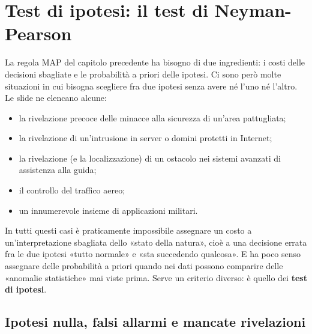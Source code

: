 \chapter{Test di ipotesi: il test di Neyman-Pearson}

La regola MAP del capitolo precedente ha bisogno di due ingredienti: i costi delle decisioni sbagliate e le probabilità
a priori delle ipotesi. Ci sono però molte situazioni in cui bisogna scegliere fra due ipotesi senza avere né l'uno né
l'altro. Le slide ne elencano alcune:
\begin{itemize}
  \item la rivelazione precoce delle minacce alla sicurezza di un'area pattugliata;
  \item la rivelazione di un'intrusione in server o domini protetti in Internet;
  \item la rivelazione (e la localizzazione) di un ostacolo nei sistemi avanzati di assistenza alla guida;
  \item il controllo del traffico aereo;
  \item un innumerevole insieme di applicazioni militari.
\end{itemize}
In tutti questi casi è praticamente impossibile assegnare un costo a un'interpretazione sbagliata dello «stato della
natura», cioè a una decisione errata fra le due ipotesi «tutto normale» e «sta succedendo qualcosa». E ha poco senso
assegnare delle probabilità a priori quando nei dati possono comparire delle «anomalie statistiche» mai viste prima.
Serve un criterio diverso: è quello dei \textbf{test di ipotesi}.

\section{Ipotesi nulla, falsi allarmi e mancate rivelazioni}


